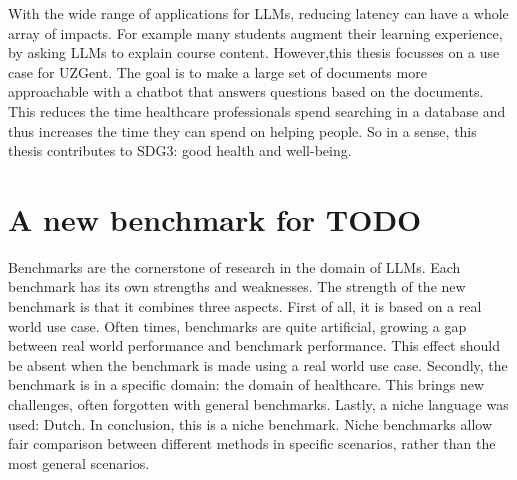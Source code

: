 
With the wide range of applications for LLMs, reducing latency can have a whole array of impacts. For example many students augment their learning experience, by asking LLMs to explain course content. However,this thesis focusses on a use case for UZGent. The goal is to make a large set of documents more approachable with a chatbot that answers questions based on the documents. This reduces the time healthcare professionals spend searching in a database and thus increases the time they can spend on helping people. So in a sense, this thesis contributes to SDG3: good health and well-being.

\section{A new benchmark for TODO}
Benchmarks are the cornerstone of research in the domain of LLMs. Each benchmark has its own strengths and weaknesses. The strength of the new benchmark is that it combines three aspects. First of all, it is based on a real world use case. Often times, benchmarks are quite artificial, growing a gap between real world performance and benchmark performance. This effect should be absent when the benchmark is made using a real world use case. Secondly, the benchmark is in a specific domain: the domain of healthcare. This brings new challenges, often forgotten with general benchmarks. Lastly, a niche language was used: Dutch. In conclusion, this is a niche benchmark. Niche benchmarks allow fair comparison between different methods in specific scenarios, rather than the most general scenarios.

